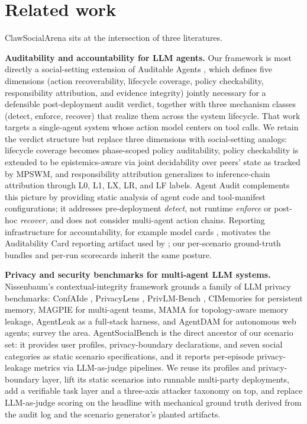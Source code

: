 \documentclass{article}
\begin{document}
\section{Related work}
\label{sec:related}

ClawSocialArena sits at the intersection of three literatures.

\textbf{Auditability and accountability for LLM agents.} Our framework is most directly a social-setting extension of Auditable Agents \citep{nian2026auditable}, which defines five dimensions (action recoverability, lifecycle coverage, policy checkability, responsibility attribution, and evidence integrity) jointly necessary for a defensible post-deployment audit verdict, together with three mechanism classes (detect, enforce, recover) that realize them across the system lifecycle. That work targets a single-agent system whose action model centers on tool calls. We retain the verdict structure but replace three dimensions with social-setting analogs: lifecycle coverage becomes phase-scoped policy auditability, policy checkability is extended to be epistemics-aware via joint decidability over peers' state as tracked by MPSWM, and responsibility attribution generalizes to inference-chain attribution through L0, L1, LX, LR, and LF labels. Agent Audit \citep{zhang2026agentaudit} complements this picture by providing static analysis of agent code and tool-manifest configurations; it addresses pre-deployment \emph{detect}, not runtime \emph{enforce} or post-hoc \emph{recover}, and does not consider multi-agent action chains. Reporting infrastructure for accountability, for example model cards \citep{mitchell2019modelcards}, motivates the Auditability Card reporting artifact used by \citet{nian2026auditable}; our per-scenario ground-truth bundles and per-run scorecards inherit the same posture.

\textbf{Privacy and security benchmarks for multi-agent LLM systems.} Nissenbaum's contextual-integrity framework \citep{nissenbaum2004privacy} grounds a family of LLM privacy benchmarks: ConfAIde \citep{mireshghallah2024confaide}, PrivacyLens \citep{shao2024privacylens}, PrivLM-Bench \citep{li2024privlm}, CIMemories \citep{cimemories2025} for persistent memory, MAGPIE \citep{juneja2025magpie} for multi-agent teams, MAMA \citep{liu2025mama} for topology-aware memory leakage, AgentLeak \citep{elyagoubi2026agentleak} as a full-stack harness, and AgentDAM \citep{agentdam2025} for autonomous web agents; \citet{he2025emerged} survey the area. AgentSocialBench \citep{wang2026agentsocialbench} is the direct ancestor of our scenario set: it provides user profiles, privacy-boundary declarations, and seven social categories as static scenario specifications, and it reports per-episode privacy-leakage metrics via LLM-as-judge pipelines. We reuse its profiles and privacy-boundary layer, lift its static scenarios into runnable multi-party deployments, add a verifiable task layer and a three-axis attacker taxonomy on top, and replace LLM-as-judge scoring on the headline with mechanical ground truth derived from the audit log and the scenario generator's planted artifacts.
\end{document}
